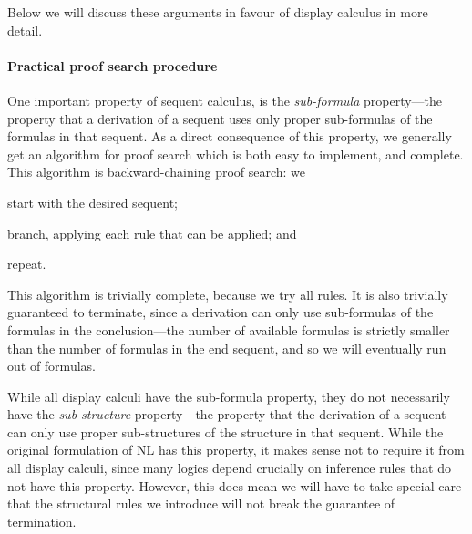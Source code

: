 Below we will discuss these arguments in favour of display calculus in
more detail.

\paragraph{Practical proof search procedure}
One important property of sequent calculus, is the \emph{sub-formula}
property---the property that a derivation of a sequent uses only
proper sub-formulas of the formulas in that sequent.
As a direct consequence of this property, we generally get an
algorithm for proof search which is both easy to implement, and
complete. This algorithm is backward-chaining proof search: we
\begin{enumerate*}[label=(\arabic*)]
\item start with the desired sequent;
\item branch, applying each rule that can be applied; and
\item repeat.
\end{enumerate*}
This algorithm is trivially complete, because we try all rules. It is
also trivially guaranteed to terminate, since a derivation can only
use sub-formulas of the formulas in the conclusion---the number of
available formulas is strictly smaller than the number of formulas in
the end sequent, and so we will eventually run out of formulas.

While all display calculi have the sub-formula property, they do not
necessarily have the \emph{sub-structure} property---the property that
the derivation of a sequent can only use proper sub-structures of the
structure in that sequent. While the original formulation of NL has
this property, it makes sense not to require it from all display
calculi, since many logics depend crucially on inference rules that do
not have this property.
However, this does mean we will have to take special care that the
structural rules we introduce will not break the guarantee of
termination.

